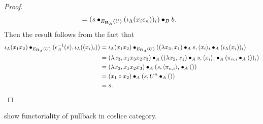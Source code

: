 \begin{proof}
\begin{align*}
    &= (s \bullet_{E_{\mathbf{R}_A}(U)} (\iota_\Lambda(x_i c_n))_i) \bullet_B b.
  \end{align*}
  Then the result follows from the fact that
  \begin{align*}
    \iota_\Lambda(x_1 x_2) \bullet_{E_{\mathbf{R}_A}(U)} (\epsilon_A^{-1}(s), \iota_\Lambda((x_i)_i))
    &= \iota_\Lambda(x_1 x_2) \bullet_{E_{\mathbf{R}_A}(U)} ((\lambda x_2, x_1) \bullet_A s, \langle x_i \rangle_i \bullet_A (\iota_\Lambda(x_i))_i)\\
    &= (\lambda x_3, x_1 x_3 x_2 x_3) \bullet_A ((\lambda x_2, x_1) \bullet_A s, \langle x_i \rangle_i \bullet_A (\pi_{n, i} \bullet_A ())_i)\\
    &= (\lambda x_3, x_1 x_2 x_3) \bullet_A (s, \langle \pi_{n, i} \rangle_i \bullet_A ())\\
    &= (x_1 \circ x_2) \bullet_A (s, U^n \bullet_A ())\\
    &= s.
  \end{align*}
\end{proof}

\TODO show functoriality of pullback in coslice category.


